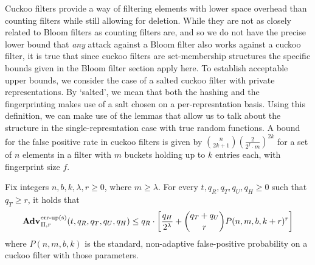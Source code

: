 Cuckoo filters provide a way of filtering elements with lower space overhead
than counting filters while still allowing for deletion. While they are not as
closely related to Bloom filters as counting filters are, and so we do not have
the precise lower bound that \textit{any} attack against a Bloom filter also
works against a cuckoo filter, it is true that since cuckoo filters are
set-membership structures the specific bounds given in the Bloom filter section
apply here. To establish acceptable upper bounds, we consider the case of a
salted cuckoo filter with private representations. By `salted', we mean that
both the hashing and the fingerprinting makes use of a salt chosen on a
per-represntation basis. Using this definition, we can make use of the lemmas
that allow us to talk about the structure in the single-represntation case with
true random functions. A bound for the false positive rate in cuckoo filters is
given by $\binom{n}{2k+1}\left(\frac{2}{2^f \cdot m}\right)^{2k}$ for a set of
$n$ elements in a filter with $m$ buckets holding up to $k$ entries each, with
fingerprint size $f$.

\begin{theorem}\label{thm:cuckoo-salt-bound}
Fix integers $n, b, k, \lambda, r\geq 0$, where $m \geq \lambda$.
  For every $t, q_R, q_T, q_U, q_H \geq 0$ such that $q_T \geq r$, it holds that
  $$\Adv{\erreps}_{\struct,r}(t, q_R, q_T, q_U, q_H) \leq q_R \cdot
     \left[
      \frac{q_H}{2^\lambda} +
      {\dbinom{q_T+q_U}{r}} P(n,m,b,k+r)^r
    \right]$$
where $P(n,m,b,k)$ is the standard, non-adaptive false-positive probability on a
cuckoo filter with those parameters.
\end{theorem}

